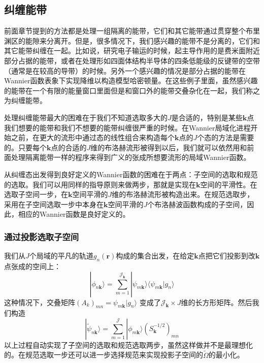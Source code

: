 \subsection{纠缠能带}
前面章节提到的方法都是处理一组隔离的能带，它们和其它能带通过贯穿整个布里渊区的能隙来分离开。但是，很多情况下，我们感兴趣的能带不是分离的，它们和其它能带纠缠在一起。比如说，研究电子输运的时候，起主导作用的是费米面附近部分占据的能带，或者在处理形如四面体结构半导体的四条低能级的反键带的空带（通常是在较高的导带）的时候。另外一个感兴趣的情况是部分占据的能带在Wannier函数表象下实现降维以构造模型哈密顿量。在这些例子里面，虽然感兴趣的能带在一个有限的能量窗口里面但是和窗口外的能带交叠杂化在一起，我们称之为纠缠能带。

处理纠缠能带最大的困难在于我们不知道选取多大的$J$是合适的，特别是某些$\bm{k}$点我们想要的能带和我们不想要的能带纠缠很严重的时候。在Wannier局域化进程开始之前，在更大的流形中通过态的线性组合来构造每个$\bm{k}$点的$J$个态的方法是需要的。只要每个$\bm{k}$点的合适的$J$维的布洛赫流形被得到以后，我们就可以依然用和前面处理隔离能带一样的程序来得到广义的张成所想要流形的局域Wannier函数。

从纠缠态出发得到良好定义的Wannier函数的困难在于两点：子空间的选取和规范的选取。我们可以用同样的指导原则来做两步，那就是实现在$\bm{k}$空间的平滑性。在选取子空间一步，在$\bm{k}$空间平滑的$J$维的布洛赫流形被构造出来。在规范选取步，采用在子空间选取一步中本身在$\bm{k}$空间平滑的$J$个布洛赫波函数构成的子空间，因此，相应的Wannier函数是良好定义的。

\subsubsection{通过投影选取子空间}
我们从$J$个局域的平凡的轨道$g_n(\bm{r})$构成的集合出发，在给定$\bm{k}$点把它们投影到改$\bm{k}$点张成的空间上：
\begin{equation}
|\phi_{n\bm{k}} \rangle=\sum_{m=1}^{\mathcal{J}_{\bm{k}}}|\psi_{m\bm{k}} \rangle \langle\psi_{m\bm{k}}|g_n \rangle
\end{equation}
这种情况下，交叠矩阵$(A_k)_{mn}=\psi_{m\bm{k}}|g_n \rangle$ 变成了$\mathcal{J}_{\bm{k}} \times J $维的长方形矩阵。然后我们构造
\begin{equation}
|\widetilde\psi_{n\bm{k}}\rangle=\sum_{m=1}^{\mathcal{J}}|\phi_{m\bm{k}} \rangle(S^{-1/2}_{\bm{k}})_{mn}
\end{equation}
以上过程自动实现了子空间的选取和规范选取两步，虽然这样做并不是最理想化的。在规范选取一步还可以进一步选择规范来实现投影子空间的$\widetilde \Omega$的最小化。

